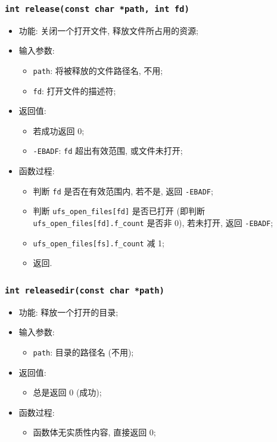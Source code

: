 \documentclass[nofonts, titlepage]{ctexart}
\begin{document}
  \subsubsection[\texttt{release}]{\texttt{int release(const char *path, int fd)}}
  \begin{itemize}
\item
  功能: 关闭一个打开文件, 释放文件所占用的资源;
\item
  输入参数:

  \begin{itemize}
  \item
    \texttt{path}: 将被释放的文件路径名, 不用;
  \item
    \texttt{fd}: 打开文件的描述符;
  \end{itemize}
\item
  返回值:

  \begin{itemize}
  \item
    若成功返回 0;
  \item
    \texttt{-EBADF}: \texttt{fd} 超出有效范围, 或文件未打开;
  \end{itemize}
\item
  函数过程:

  \begin{itemize}
  \item
    判断 \texttt{fd} 是否在有效范围内, 若不是, 返回 \texttt{-EBADF};
  \item
    判断 \texttt{ufs\_open\_files{[}fd{]}} 是否已打开 (即判断
    \texttt{ufs\_open\_files{[}fd{]}.f\_count} 是否非 0), 若未打开, 返回
    \texttt{-EBADF};
  \item
    \texttt{ufs\_open\_files{[}fs{]}.f\_count} 减 1;
  \item
    返回.
  \end{itemize}
  \end{itemize}
  \subsubsection[\texttt{releasedir}]{\texttt{int releasedir(const char *path)}}
  \begin{itemize}
\item
  功能: 释放一个打开的目录;
\item
  输入参数:

  \begin{itemize}
  \item
    \texttt{path}: 目录的路径名 (不用);
  \end{itemize}
\item
  返回值:

  \begin{itemize}
  \item
    总是返回 0 (成功);
  \end{itemize}
\item
  函数过程:

  \begin{itemize}
  \item
    函数体无实质性内容, 直接返回 0;
  \end{itemize}
  \end{itemize}
\end{document}
